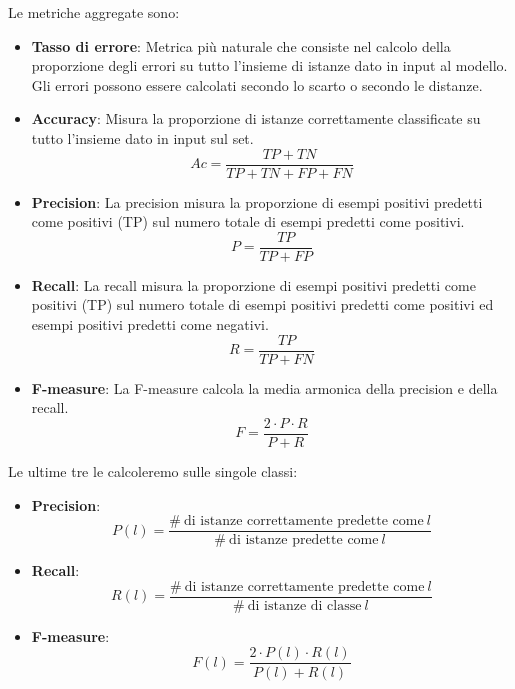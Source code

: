 Le metriche aggregate sono:
\begin{itemize}
    \item \textbf{Tasso di errore}:
          Metrica più naturale che consiste nel calcolo della proporzione degli
          errori su tutto l'insieme di istanze dato in input al modello. Gli errori
          possono essere calcolati secondo lo scarto o secondo le distanze.
    \item \textbf{Accuracy}:
          Misura la proporzione di istanze correttamente classificate su tutto
          l'insieme dato in input sul set.
          \begin{equation}
              Ac = \frac{TP+TN}{TP+TN+FP+FN}
          \end{equation}
    \item \textbf{Precision}:
          La precision misura la proporzione di esempi positivi predetti come
          positivi (TP) sul numero totale di esempi predetti come positivi.
          \begin{equation}
              P=\frac{TP}{TP+FP}
          \end{equation}
    \item \textbf{Recall}:
          La recall misura la proporzione di esempi positivi predetti come positivi
          (TP) sul numero totale di esempi positivi predetti come positivi ed
          esempi positivi predetti come negativi.
          \begin{equation}
              R=\frac{TP}{TP+FN}
          \end{equation}
    \item \textbf{F-measure}:
          La F-measure calcola la media armonica della precision e della recall.
          \begin{equation}
              F = \frac{2\cdot P\cdot R}{P+R}
          \end{equation}
\end{itemize}
Le ultime tre le calcoleremo sulle singole classi:
\begin{itemize}
    \item \textbf{Precision}:
          \begin{equation}
              P(l)=\frac{\# \ \text{di istanze correttamente predette come} \ l}{\#
                  \ \text{di istanze predette come} \ l}
          \end{equation}
    \item \textbf{Recall}:
          \begin{equation}
              R(l)=\frac{\# \ \text{di istanze correttamente predette come} \ l}{\#
                  \ \text{di istanze di classe} \ l}
          \end{equation}
    \item \textbf{F-measure}:
          \begin{equation}
              F(l) = \frac{2\cdot P(l)\cdot R(l)}{P(l)+R(l)}
          \end{equation}
\end{itemize}

